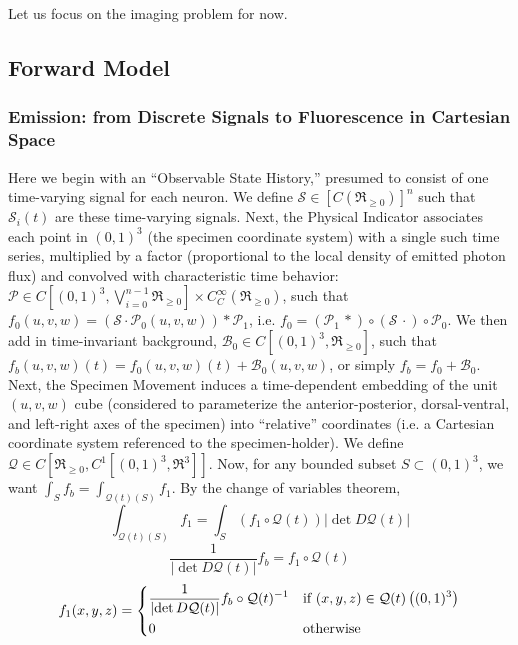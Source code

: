 Let us focus on the imaging problem for now.

\subsection{Forward Model}

\subsubsection{Emission: from Discrete Signals to Fluorescence in Cartesian Space}

Here we begin with an
``{\color{blue!60!green}Observable State History},'' presumed to consist of one
time-varying signal for each neuron. We define $\mathcal{S} \in
\left[C(\Re_{\ge 0})\right]^n$ such that $\mathcal{S}_i(t)$ are these
time-varying signals. Next, the Physical Indicator associates each point in
$(0,1)^3$ (the specimen coordinate system) with a single such time series, multiplied by a factor (proportional to the local density of emitted photon flux) and convolved
with characteristic time behavior: $\mathcal{P} \in
C\!\left[(0,1)^3,\bigvee_{i=0}^{n-1} \Re_{\ge 0}\right] \times
C^\infty_C(\Re_{\ge 0})$, such that $f_0(u,v,w) = \left(\mathcal{S} \cdot \mathcal{P}_0(u,v,w) \right) \ast \mathcal{P}_1$, i.e. $f_0 = \left(\mathcal{P}_1 \,\ast\right) \circ \left(\mathcal{S} \, \cdot\right) \circ \mathcal{P}_0$. We then add in time-invariant background, $\mathcal{B}_0 \in C\left[(0,1)^3,\Re_{\ge 0}\right]$, such that $f_b(u,v,w)(t)=f_0(u,v,w)(t)+\mathcal{B}_0(u,v,w)$, or simply $f_b = f_0 + \mathcal{B}_0$.
Next, the Specimen Movement induces a time-dependent embedding of the unit $(u,v,w)$ cube (considered to parameterize the anterior-posterior, dorsal-ventral, and left-right axes of the specimen) into ``relative'' coordinates (i.e. a Cartesian coordinate system referenced to the specimen-holder). We define $\mathcal{Q} \in C\left[\Re_{\geq 0}, C^1\left[(0,1)^3,\Re^3\right]\right]$. Now, for any bounded
subset $S \subset (0,1)^3$, we want $\int_S f_b = \int_{\mathcal{Q}(t)(S)} f_1$. By the change of variables theorem,
\[\int_{\mathcal{Q}(t)(S)} f_1 = \int_S \left(f_1 \circ \mathcal{Q}(t)\right) \left|\det D\mathcal{Q}(t)\right|\]
\[\frac{1}{\left|\det D\mathcal{Q}(t)\right|} f_b = f_1 \circ \mathcal{Q}(t) \]
\[f_1(x,y,z) = \begin{dcases} \frac{1}{\left|\det D\mathcal{Q}(t)\right|} f_b \circ \mathcal{Q}(t)^{-1} & \mbox{if } (x,y,z) \in \mathcal{Q}(t)\left((0,1)^3\right) \\ 0 & \mbox{otherwise} \end{dcases}\]
